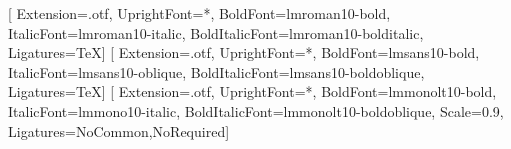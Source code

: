 %

\usepackage{fontspec}
\setmainfont{lmroman10-regular}[
  Extension=.otf,
  UprightFont=*,
  BoldFont=lmroman10-bold,
  ItalicFont=lmroman10-italic,
  BoldItalicFont=lmroman10-bolditalic,
  Ligatures=TeX]
\setsansfont{lmsans10-regular}[
  Extension=.otf,
  UprightFont=*,
  BoldFont=lmsans10-bold,
  ItalicFont=lmsans10-oblique,
  BoldItalicFont=lmsans10-boldoblique,
  Ligatures=TeX]
\setmonofont{lmmono10-regular}[
  Extension=.otf,
  UprightFont=*,
  BoldFont=lmmonolt10-bold,
  ItalicFont=lmmono10-italic,
  BoldItalicFont=lmmonolt10-boldoblique,
  Scale=0.9,
  Ligatures={NoCommon,NoRequired}]

\usepackage{geometry}
\geometry{top=2.4cm,bottom=2.4cm,left=2.6cm,right=2.6cm,headheight=15pt,footskip=1.0cm}
\usepackage{indentfirst}
\setlength{\parindent}{1.5em}
\setlength{\parskip}{0.2em}
\setlength{\emergencystretch}{3em}
\renewcommand{\arraystretch}{1.15}
\setlength{\tabcolsep}{4pt}

\usepackage{titlesec}

\setlength{\textfloatsep}{10pt plus 2pt minus 2pt}
\setlength{\floatsep}{9pt plus 2pt minus 2pt}
\setlength{\intextsep}{9pt plus 2pt minus 2pt}
\setlength{\abovecaptionskip}{5pt}
\setlength{\belowcaptionskip}{2pt}

